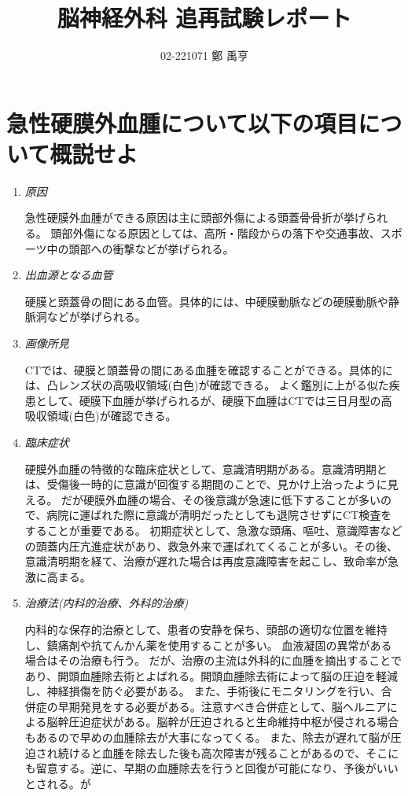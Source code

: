 \documentclass[a4paper,10.5pt]{jsarticle}
\begin{document}
\title{脳神経外科 追再試験レポート}
\author{02-221071 鄭 禹亨}
\date{}
\maketitle

\section{急性硬膜外血腫について以下の項目について概説せよ}
\begin{enumerate}
  \item \emph{原因}\par 急性硬膜外血腫ができる原因は主に頭部外傷による頭蓋骨骨折が挙げられる。
  頭部外傷になる原因としては、高所・階段からの落下や交通事故、スポーツ中の頭部への衝撃などが挙げられる。
  \item \emph{出血源となる血管}\par 硬膜と頭蓋骨の間にある血管。具体的には、中硬膜動脈などの硬膜動脈や静脈洞などが挙げられる。
  \item \emph{画像所見}\par CTでは、硬膜と頭蓋骨の間にある血腫を確認することができる。具体的には、凸レンズ状の高吸収領域(白色)が確認できる。
  よく鑑別に上がる似た疾患として、硬膜下血腫が挙げられるが、硬膜下血腫はCTでは三日月型の高吸収領域(白色)が確認できる。
  \item \emph{臨床症状}\par 硬膜外血腫の特徴的な臨床症状として、意識清明期がある。意識清明期とは、受傷後一時的に意識が回復する期間のことで、見かけ上治ったように見える。
  だが硬膜外血腫の場合、その後意識が急速に低下することが多いので、病院に運ばれた際に意識が清明だったとしても退院させずにCT検査をすることが重要である。
  初期症状として、急激な頭痛、嘔吐、意識障害などの頭蓋内圧亢進症状があり、救急外来で運ばれてくることが多い。その後、意識清明期を経て、治療が遅れた場合は再度意識障害を起こし、致命率が急激に高まる。
  \item \emph{\textup{治療法(内科的治療、外科的治療)}}\par 内科的な保存的治療として、患者の安静を保ち、頭部の適切な位置を維持し、鎮痛剤や抗てんかん薬を使用することが多い。
  血液凝固の異常がある場合はその治療も行う。
  だが、治療の主流は外科的に血腫を摘出することであり、開頭血腫除去術とよばれる。開頭血腫除去術によって脳の圧迫を軽減し、神経損傷を防ぐ必要がある。
  また、手術後にモニタリングを行い、合併症の早期発見をする必要がある。注意すべき合併症として、脳ヘルニアによる脳幹圧迫症状がある。脳幹が圧迫されると生命維持中枢が侵される場合もあるので早めの血腫除去が大事になってくる。
  また、除去が遅れて脳が圧迫され続けると血腫を除去した後も高次障害が残ることがあるので、そこにも留意する。逆に、早期の血腫除去を行うと回復が可能になり、予後がいいとされる。が
\end{enumerate}
\end{document}
